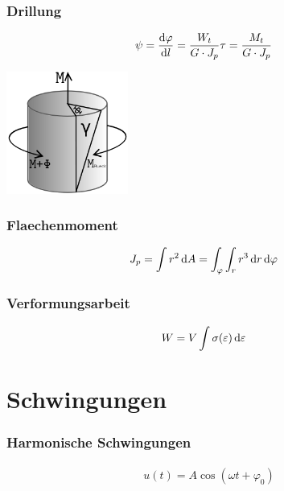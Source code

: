 \subsubsection{Drillung}

\begin{multicols}{2}{}
\begin{align*}
\psi&=\frac{\mathop{}\!\mathrm{d} \varphi}{\mathop{}\!\mathrm{d} l}=\frac{W_t}{G\cdot J_p}\tau=\frac{M_t}{G\cdot J_p}
\end{align*}
\hfill

\begin{center}
 \includegraphics[width=40mm,height=40mm,keepaspectratio=true]{./Physik/Bilder/Scherbeanspruchung.png}
\end{center}
\end{multicols}


\begin{multicols}{2}{}
\subsubsection{Flaechenmoment}
\begin{align*}
J_p&=\int r^2\mathop{}\!\mathrm{d} A=\int_\varphi\int_r r^3\mathop{}\!\mathrm{d} r \mathop{}\!\mathrm{d} \varphi 
\end{align*}


\subsubsection{Verformungsarbeit}
\begin{align*}
W&=V\int \sigma(\varepsilon) \mathop{}\!\mathrm{d} \varepsilon 
\end{align*}
\end{multicols}


\section{Schwingungen}


\subsubsection{Harmonische Schwingungen}
\begin{align*}
u(t)=A\cos(\omega t+\varphi_0)
\end{align*}


